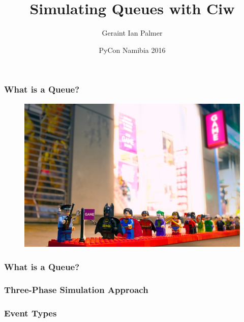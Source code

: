 \documentclass{beamer}
\title
{Simulating Queues with Ciw}
\author{Geraint Ian Palmer}
\date{PyCon Namibia 2016}
\begin{document}
\frame{\titlepage}

\begin{frame}
\frametitle{What is a Queue?}
\begin{figure}
  
\end{figure}
\end{frame}

\begin{frame}
\begin{figure}
    \includegraphics[width=\textwidth]{legoqueue}
\end{figure}
\end{frame}

\begin{frame}
\frametitle{What is a Queue?}
\begin{figure}
  
\end{figure}
\end{frame}


\begin{frame}
\begin{figure}
    
\end{figure}
\end{frame}

\begin{frame}
\frametitle{Three-Phase Simulation Approach}
\begin{figure}
    
\end{figure}
\end{frame}

\begin{frame}
\frametitle{Event Types}
\begin{center}
\begin{figure}
    
\end{figure}
\end{center}
\end{frame}
\end{document}
